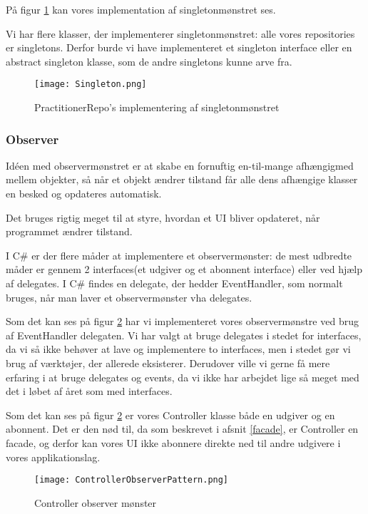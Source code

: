 På figur \ref{code:singleton} kan vores implementation af singletonmønstret ses.

Vi har flere klasser, der implementerer singletonmønstret: alle vores repositories er singletons.
Derfor burde vi have implementeret et singleton interface eller en abstract singleton klasse, som de andre singletons kunne arve fra.

\begin{figure}[h]
    \caption{PractitionerRepo's implementering af singletonmønstret}
    \centering
        \texttt{[image: Singleton.png]}
    \label{code:singleton}
\end{figure}

\subsubsection{Observer}
\label{observer}

Idéen med observermønstret er at skabe en fornuftig en-til-mange afhængigmed mellem objekter, så når et objekt ændrer tilstand får alle dens afhængige klasser en besked og opdateres automatisk.\cite{gangoffour}

Det bruges rigtig meget til at styre, hvordan et UI bliver opdateret, når programmet ændrer tilstand.

I C\# er der flere måder at implementere et observermønster: de mest udbredte måder er gennem 2 interfaces(et udgiver og et abonnent interface) eller ved hjælp af delegates.
I C\# findes en delegate, der hedder EventHandler, som normalt bruges, når man laver et observermønster vha delegates.

Som det kan ses på figur \ref{fig:ControllerObserverPattern} har vi implementeret vores observermønstre ved brug af EventHandler delegaten.
Vi har valgt at bruge delegates i stedet for interfaces, da vi så ikke behøver at lave og implementere to interfaces, men i stedet gør vi brug af værktøjer, der allerede eksisterer.
Derudover ville vi gerne få mere erfaring i at bruge delegates og events, da vi ikke har arbejdet lige så meget med det i løbet af året som med interfaces.

Som det kan ses på figur \ref{fig:ControllerObserverPattern} er vores Controller klasse både en udgiver og en abonnent.
Det er den nød til, da som beskrevet i afsnit \ref{facade}, er Controller en facade, og derfor kan vores UI ikke abonnere direkte ned til andre udgivere i vores applikationslag.


\begin{figure}[h]
    \caption{Controller observer mønster}
    \centering
        \texttt{[image: ControllerObserverPattern.png]}
    \label{fig:ControllerObserverPattern}
\end{figure}

